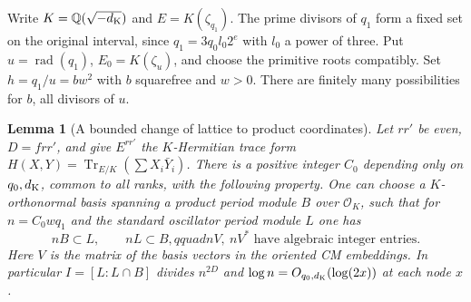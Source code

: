 \documentclass[a4paper,11pt]{article}
\newtheorem{lemma}[proposition]{Lemma}
\theoremstyle{definition}
\theoremstyle{remark}
\numberwithin{equation}{section}
\newcommand{\OO}{\mathcal O}
\begin{document}
Write \(K=\mathbb Q(\sqrt{-d_{\rm K}})\) and
\(E=K(\zeta_{q_1})\). The prime divisors of \(q_1\) form a
fixed set on the original interval, since \(q_1=3q_0l_0 2^e\)
with \(l_0\) a power of three. Put \(u=\operatorname{rad}(q_1)\),
\(E_0=K(\zeta_u)\), and choose the primitive roots compatibly.
Set \(h=q_1/u=b w^2\) with \(b\) squarefree and \(w>0\). There
are finitely many possibilities for \(b\), all divisors of \(u\).

\begin{lemma}[A bounded change of lattice to product coordinates]
\leavevmode\label{lem:tracebasis821}
Let \(r r'\) be even, \(D=f r r'\), and give \(E^{rr'}\) the
\(K\)-Hermitian trace form
\(H(X,Y)=\operatorname{Tr}_{E/K}(\sum X_i\bar Y_i)\).
There is a positive integer \(C_0\) depending only on
\(q_0,d_{\rm K}\), common to all ranks, with the following
property. One can choose a \(K\)-orthonormal basis spanning
a product period module \(B\) over \(\OO_K\), such that for
\(n=C_0 w q_1\) and the standard oscillator period module
\(L\) one has
\[
       nB\subset L,\qquad nL\subset B,qquad
       n V,\ nV^*\text{ have algebraic integer entries}.
\]
Here \(V\) is the matrix of the basis vectors in the oriented CM
embeddings. In particular \(I=[L:L\cap B]\) divides \(n^{2D}\)
and \(\log n=O_{q_0,d_{\rm K}}(\log(2x))\) at each node \(x\).
\end{lemma}
\end{document}
